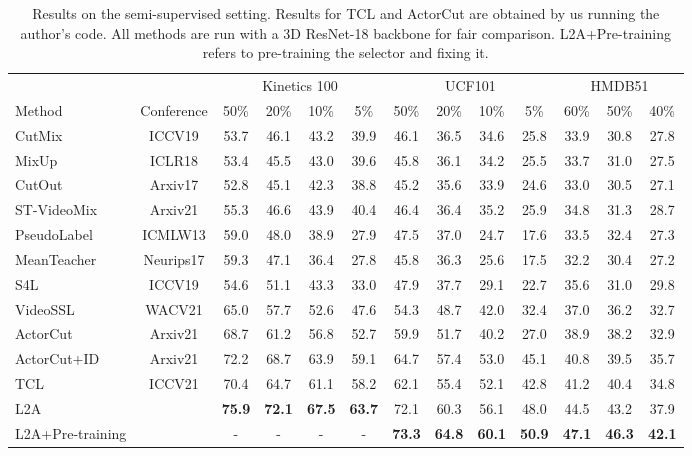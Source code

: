 \documentclass[runningheads]{llncs}
\newcommand{\MethodShort}{L2A\xspace}
\begin{document}
\begin{table}[]
\setlength{\tabcolsep}{5pt}
\centering
\resizebox{\columnwidth}{!}
{\begin{tabular}{l@{\ }cccccccccccc}
     &  & \multicolumn{4}{c}{Kinetics 100} & \multicolumn{4}{c}{UCF101} & \multicolumn{3}{c}{HMDB51} \\
Method & Conference & 50\%   & 20\%   & 10\%   & 5\%   & 50\%  & 20\%  & 10\% & 5\% & 60\%    & 50\%    & 40\%   \\
\hline
CutMix~\cite{yun2019cutmix} & ICCV19 & 53.7 & 46.1 & 43.2 & 39.9 & 46.1 & 36.5 & 34.6 & 25.8 & 33.9 & 30.8 & 27.8 \\
MixUp~\cite{mixup} & ICLR18 & 53.4 & 45.5 & 43.0 & 39.6 & 45.8 & 36.1 & 34.2 & 25.5 & 33.7 & 31.0 & 27.5 \\
CutOut~\cite{cutout}& Arxiv17 & 52.8 & 45.1 & 42.3 & 38.8 & 45.2 & 35.6 & 33.9 & 24.6 & 33.0 & 30.5 & 27.1 \\
ST-VideoMix~\cite{videomix} &Arxiv21 & 55.3 & 46.6 & 43.9 & 40.4 & 46.4 & 36.4 & 35.2 & 25.9 & 34.8 & 31.3 & 28.7 \\
\hline
PseudoLabel~\cite{pseudo} &ICMLW13  & 59.0 & 48.0 & 38.9 & 27.9 & 47.5  & 37.0  & 24.7 & 17.6 & 33.5    & 32.4    & 27.3    \\  
MeanTeacher~\cite{meanteacher}& Neurips17 & 59.3 & 47.1 & 36.4 & 27.8  & 45.8  & 36.3  & 25.6 & 17.5 & 32.2    & 30.4    & 27.2    \\
S4L~\cite{s4l}& ICCV19 & 54.6 & 51.1 & 43.3 & 33.0 & 47.9  & 37.7  & 29.1 & 22.7 & 35.6    & 31.0    & 29.8    \\
VideoSSL~\cite{Jing_2021_WACV}& WACV21 & 65.0 & 57.7 & 52.6 & 47.6  & 54.3  & 48.7  & 42.0 & 32.4 & 37.0    & 36.2    & 32.7    \\
ActorCut~\cite{actorcut} &Arxiv21 & 68.7 & 61.2 & 56.8 & 52.7  & 59.9  & 51.7  & 40.2 & 27.0 & 38.9    & 38.2    & 32.9    \\
ActorCut+ID~\cite{actorcut}& Arxiv21 & 72.2 & 68.7 & 63.9 & 59.1 & 64.7 & 57.4 & 53.0 & 45.1 & 40.8 & 39.5 & 35.7    \\
TCL~\cite{tcl}& ICCV21 & 70.4 & 64.7 & 61.1 & 58.2 & 62.1 & 55.4 & 52.1 & 42.8 & 41.2 & 40.4 & 34.8\\
\MethodShort& & \textbf{75.9} & \textbf{72.1} & \textbf{67.5} & \textbf{63.7} & 72.1 & 60.3 & 56.1 & 48.0 & 44.5 & 43.2 & 37.9 \\ 
\hline
\MethodShort+Pre-training& & - & - & - & - & \textbf{73.3} & \textbf{64.8} & \textbf{60.1} & \textbf{50.9} & \textbf{47.1} & \textbf{46.3} & \textbf{42.1} \\
\end{tabular}}
\caption{Results on the semi-supervised setting. Results for TCL and ActorCut are obtained by us running the author's code. All methods are run with a 3D ResNet-18 backbone for fair comparison. \MethodShort+Pre-training refers to pre-training the selector and fixing it.}

\label{tab:semi}
\end{table}
\end{document}
